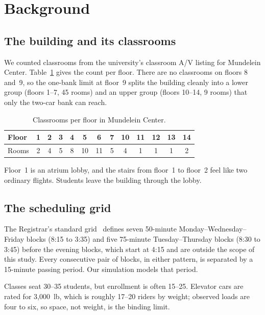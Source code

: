\section{Background}

\subsection{The building and its classrooms}

We counted classrooms from the university's classroom A/V listing for Mundelein Center. Table~\ref{tab:rooms} gives the
count per floor. There are no classrooms on floors 8 and~9, so the one-bank limit at floor~9 splits the
building cleanly into a lower group (floors 1--7, 45 rooms) and an upper group (floors 10--14, 9 rooms) that only
the two-car bank can reach.

\begin{table}[h]
\centering
\caption{Classrooms per floor in Mundelein Center.}
\label{tab:rooms}
\begin{tabular}{lcccccccccccc}
\toprule
Floor & 1 & 2 & 3 & 4 & 5 & 6 & 7 & 10 & 11 & 12 & 13 & 14\\
\midrule
Rooms & 2 & 4 & 5 & 8 & 10 & 11 & 5 & 4 & 1 & 1 & 1 & 2\\
\bottomrule
\end{tabular}
\end{table}

Floor~1 is an atrium lobby, and the stairs from floor~1 to floor~2 feel like two ordinary flights. Students
leave the building through the lobby.

\subsection{The scheduling grid}

The Registrar's standard grid~\cite{luc-grid} defines seven 50-minute Monday--Wednesday--Friday blocks (8:15 to
3:35) and five 75-minute Tuesday--Thursday blocks (8:30 to 3:45) before the evening blocks, which start at
4:15 and are outside the scope of this study. Every consecutive pair of blocks, in either pattern, is separated
by a 15-minute passing period. Our simulation models that period.

Classes seat 30--35 students, but enrollment is often 15--25. Elevator cars are rated for 3{,}000~lb, which is
roughly 17--20 riders by weight; observed loads are four to six, so space, not weight, is the binding limit.

